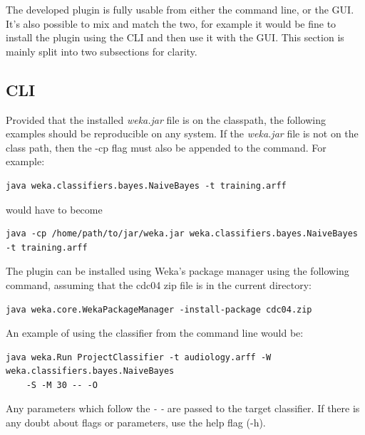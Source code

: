 
The developed plugin is fully usable from either the command line, or the GUI. It's also possible to mix and match the two, for example it would be fine to install the plugin using the CLI and then use it with the GUI. This section is mainly split into two subsections for clarity.

\subsection{CLI}

Provided that the installed \textit{weka.jar} file is on the classpath, the following examples should be reproducible on any system. If the \textit{weka.jar} file is not on the class path, then the -cp flag must also be appended to the command. For example:

\begin{footnotesize}
\begin{verbatim}
java weka.classifiers.bayes.NaiveBayes -t training.arff
\end{verbatim}
\end{footnotesize}
would have to become
\begin{footnotesize}
\begin{verbatim}
java -cp /home/path/to/jar/weka.jar weka.classifiers.bayes.NaiveBayes -t training.arff
\end{verbatim}
\end{footnotesize}

The plugin can be installed using Weka's package manager using the following command, assuming that the cdc04 zip file is in the current directory:

\begin{footnotesize}
\begin{verbatim}
java weka.core.WekaPackageManager -install-package cdc04.zip
\end{verbatim}
\end{footnotesize}

An example of using the classifier from the command line would be:

\begin{footnotesize}
\begin{verbatim}
java weka.Run ProjectClassifier -t audiology.arff -W weka.classifiers.bayes.NaiveBayes
    -S -M 30 -- -O
\end{verbatim}
\end{footnotesize}

Any parameters which follow the \textit{- -} are passed to the target classifier. If there is any doubt about flags or parameters, use the help flag (-h).

